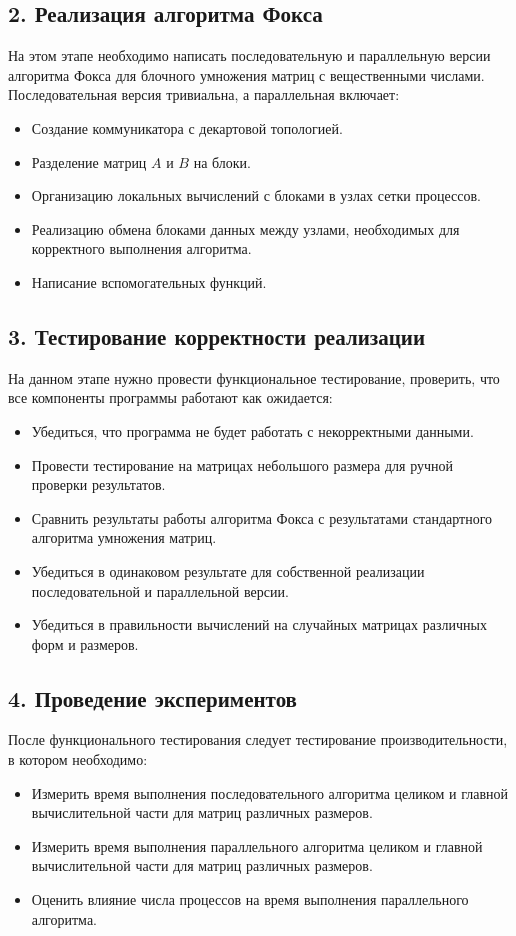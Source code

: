 \documentclass{report}
\begin{document}
\subsection*{2. Реализация алгоритма Фокса}
На этом этапе необходимо написать последовательную и параллельную версии алгоритма Фокса для блочного умножения матриц с вещественными числами. Последовательная версия тривиальна, а параллельная включает: 
\begin{itemize}
    \item Создание коммуникатора с декартовой топологией.
    \item Разделение матриц \(A\) и \(B\) на блоки.
    \item Организацию локальных вычислений с блоками в узлах сетки процессов.
    \item Реализацию обмена блоками данных между узлами, необходимых для корректного выполнения алгоритма.
    \item Написание вспомогательных функций.
\end{itemize}

\subsection*{3. Тестирование корректности реализации}
На данном этапе нужно провести функциональное тестирование, проверить, что все компоненты программы работают как ожидается:
\begin{itemize}
    \item Убедиться, что программа не будет работать с некорректными данными.
    \item Провести тестирование на матрицах небольшого размера для ручной проверки результатов.
    \item Сравнить результаты работы алгоритма Фокса с результатами стандартного алгоритма умножения матриц.
    \item Убедиться в одинаковом результате для собственной реализации последовательной и параллельной версии.
    \item Убедиться в правильности вычислений на случайных матрицах различных форм и размеров.
\end{itemize}

\subsection*{4. Проведение экспериментов}
После функционального тестирования следует тестирование производительности, в котором необходимо:
\begin{itemize}
    \item Измерить время выполнения последовательного алгоритма целиком и главной вычислительной части для матриц различных размеров.
    \item Измерить время выполнения параллельного алгоритма целиком и главной вычислительной части для матриц различных размеров.
    \item Оценить влияние числа процессов на время выполнения параллельного алгоритма.
\end{itemize}
\end{document}
